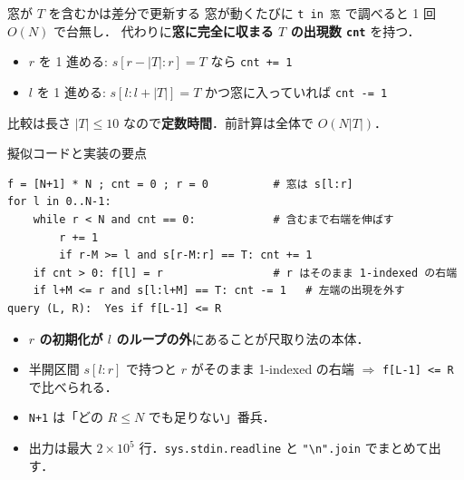 \documentclass[dvipdfmx,aspectratio=169]{beamer}
\newcommand{\strrow}[1]{%
  \foreach \c [count=\i from 0] in {a,b,c,d,a,b,c}{
    \draw (\i*0.8,#1) rectangle ++(0.8,0.6);
    \node[font=\ttfamily] at (\i*0.8+0.4,#1+0.3) {\c};
  }}
\begin{document}
\begin{frame}{窓が $T$ を含むかは差分で更新する}
  窓が動くたびに \texttt{t in 窓} で調べると 1 回 $O(N)$ で台無し．
  代わりに\textbf{窓に完全に収まる $T$ の出現数 \texttt{cnt}} を持つ．

  \vspace{0.6em}
  \begin{center}
  \end{center}

  \vspace{0.2em}
  \begin{itemize}
    \item $r$ を 1 進める: $s[r-|T|:r] = T$ なら \texttt{cnt += 1}
    \item $l$ を 1 進める: $s[l:l+|T|] = T$ かつ窓に入っていれば \texttt{cnt -= 1}
  \end{itemize}
  比較は長さ $|T| \le 10$ なので\textbf{定数時間}．前計算は全体で $O(N|T|)$．
\end{frame}

\begin{frame}[fragile]{擬似コードと実装の要点}
\begin{verbatim}
f = [N+1] * N ; cnt = 0 ; r = 0          # 窓は s[l:r]
for l in 0..N-1:
    while r < N and cnt == 0:            # 含むまで右端を伸ばす
        r += 1
        if r-M >= l and s[r-M:r] == T: cnt += 1
    if cnt > 0: f[l] = r                 # r はそのまま 1-indexed の右端
    if l+M <= r and s[l:l+M] == T: cnt -= 1   # 左端の出現を外す
query (L, R):  Yes if f[L-1] <= R
\end{verbatim}

  \vspace{0.2em}
  \begin{itemize}
    \item \textbf{$r$ の初期化が $l$ のループの外}にあることが尺取り法の本体．
    \item 半開区間 $s[l:r]$ で持つと $r$ がそのまま 1-indexed の右端 $\Rightarrow$ \verb|f[L-1] <= R| で比べられる．
    \item \verb|N+1| は「どの $R \le N$ でも足りない」番兵．
    \item 出力は最大 $2\times10^5$ 行．\verb|sys.stdin.readline| と \verb|"\n".join| でまとめて出す．
  \end{itemize}
\end{frame}
\end{document}
